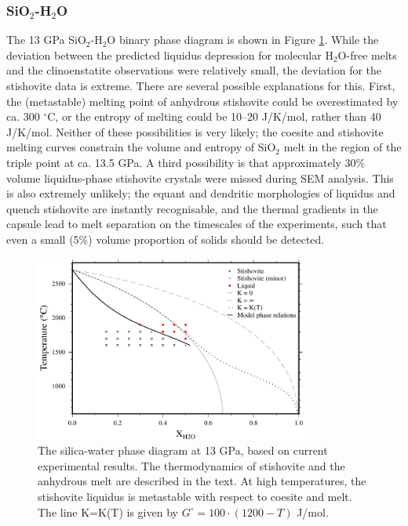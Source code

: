 \documentclass[review]{elsarticle}
\begin{document}
\subsubsection{SiO$_2$-H$_2$O}
The 13 GPa SiO$_2$-H$_2$O binary phase diagram is shown in Figure \ref{fig:SH}. While the deviation between the predicted liquidus depression for molecular H$_2$O-free melts and the clinoenstatite observations were relatively small, the deviation for the stishovite data is extreme. There are several possible explanations for this. First, the (metastable) melting point of anhydrous stishovite could be overestimated by ca. 300 $^{\circ}$C, or the entropy of melting could be 10--20 J/K/mol, rather than 40 J/K/mol. Neither of these possibilities is very likely; the coesite and stishovite melting curves constrain the volume and entropy of SiO$_2$ melt in the region of the triple point at ca. 13.5 GPa. A third possibility is that approximately 30\% volume liquidus-phase stishovite crystals were missed during SEM analysis. This is also extremely unlikely; the equant and dendritic morphologies of liquidus and quench stishovite are instantly recognisable, and the thermal gradients in the capsule lead to melt separation on the timescales of the experiments, such that even a small (5\%) volume proportion of solids should be detected.

\begin{figure}[ht!]
  \centering
      \includegraphics[width=0.8\textwidth]{figures/stishovite}
      \caption{The silica-water phase diagram at 13 GPa, based on current experimental results. The thermodynamics of stishovite and the anhydrous melt are described in the text. At high temperatures, the stishovite liquidus is metastable with respect to coesite and melt. The line K=K(T) is given by $G^{\circ} = 100 \cdot (1200-T)$ J/mol.}
  \label{fig:SH}
\end{figure}
\end{document}
